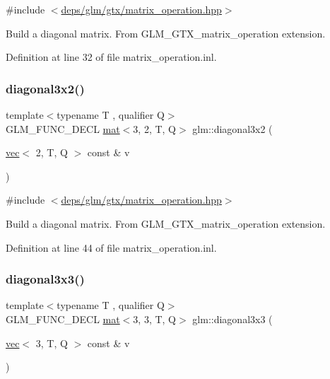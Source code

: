 {\ttfamily \#include $<$\hyperlink{matrix__operation_8hpp}{deps/glm/gtx/matrix\+\_\+operation.\+hpp}$>$}

Build a diagonal matrix. From G\+L\+M\+\_\+\+G\+T\+X\+\_\+matrix\+\_\+operation extension. 

Definition at line 32 of file matrix\+\_\+operation.\+inl.

\mbox{\label{group__gtx__matrix__operation_ga832c805d5130d28ad76236958d15b47d}} 
\subsubsection{\texorpdfstring{diagonal3x2()}{diagonal3x2()}}
{\footnotesize\ttfamily template$<$typename T , qualifier Q$>$ \\
G\+L\+M\+\_\+\+F\+U\+N\+C\+\_\+\+D\+E\+CL \hyperlink{structglm_1_1mat}{mat}$<$3, 2, T, Q$>$ glm\+::diagonal3x2 (\begin{DoxyParamCaption}\item[{\hyperlink{structglm_1_1vec}{vec}$<$ 2, T, Q $>$ const \&}]{v }\end{DoxyParamCaption})}



{\ttfamily \#include $<$\hyperlink{matrix__operation_8hpp}{deps/glm/gtx/matrix\+\_\+operation.\+hpp}$>$}

Build a diagonal matrix. From G\+L\+M\+\_\+\+G\+T\+X\+\_\+matrix\+\_\+operation extension. 

Definition at line 44 of file matrix\+\_\+operation.\+inl.

\mbox{\label{group__gtx__matrix__operation_ga5487ff9cdbc8e04d594adef1bcb16ee0}} 
\subsubsection{\texorpdfstring{diagonal3x3()}{diagonal3x3()}}
{\footnotesize\ttfamily template$<$typename T , qualifier Q$>$ \\
G\+L\+M\+\_\+\+F\+U\+N\+C\+\_\+\+D\+E\+CL \hyperlink{structglm_1_1mat}{mat}$<$3, 3, T, Q$>$ glm\+::diagonal3x3 (\begin{DoxyParamCaption}\item[{\hyperlink{structglm_1_1vec}{vec}$<$ 3, T, Q $>$ const \&}]{v }\end{DoxyParamCaption})}



